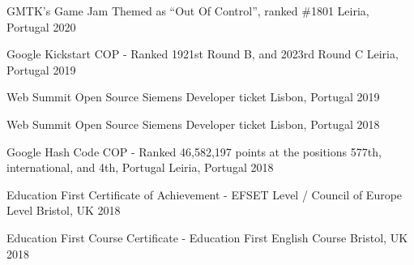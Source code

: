 



\begin{cvhonors}

  \cvhonor
    {GMTK’s Game Jam} %
    {Themed as ``Out Of Control”, ranked \#1801} %
    {Leiria, Portugal} %
    {2020} %

  \cvhonor
    {Google Kickstart} %
    {COP - Ranked 1921st Round B, and 2023rd Round C} %
    {Leiria, Portugal} %
    {2019} %

  \cvhonor
    {Web Summit} %
    {Open Source Siemens Developer ticket} %
    {Lisbon, Portugal} %
    {2019} %

  \cvhonor
    {Web Summit} %
    {Open Source Siemens Developer ticket} %
    {Lisbon, Portugal} %
    {2018} %

  \cvhonor
    {Google Hash Code} %
    {COP - Ranked 46,582,197 points at the positions 577th, international, and 4th, Portugal} %
    {Leiria, Portugal} %
    {2018} %

  \cvhonor
    {Education First} %
    {Certificate of Achievement - EFSET Level / Council of Europe Level} %
    {Bristol, UK} %
    {2018} %

  \cvhonor
    {Education First} %
    {Course Certificate - Education First English Course} %
    {Bristol, UK} %
    {2018} %

\end{cvhonors}

